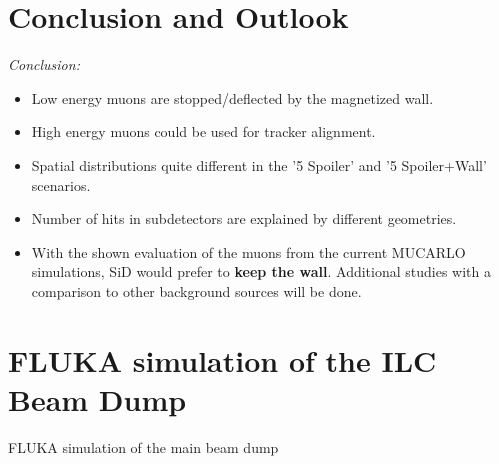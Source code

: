 \documentclass[xcolor={dvipsnames}]{beamer}
\begin{document}
\section{Conclusion and Outlook}
\begin{frame}
\textit{Conclusion:}
\begin{itemize}
\item Low energy muons are stopped/deflected by the magnetized wall.
\item High energy muons could be used for tracker alignment.
\item Spatial distributions quite different in the '5 Spoiler' and '5 Spoiler+Wall' scenarios.
\item Number of hits in subdetectors are explained by different geometries.
\item \alert{With the shown evaluation of the muons from the current MUCARLO simulations, SiD would prefer to \textbf{keep the wall}. Additional studies with a comparison to other background sources will be done.}
\end{itemize}
\end{frame}


\section{FLUKA simulation of the ILC Beam Dump}
\begin{frame}
 \centering \LARGE FLUKA simulation of the main beam dump
\end{frame}
\end{document}
